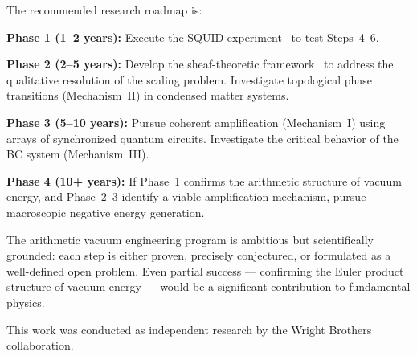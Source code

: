 \documentclass[aps,prd,twocolumn,superscriptaddress,nofootinbib]{revtex4-2}
\begin{document}
The recommended research roadmap is:

\textbf{Phase 1 (1--2 years):}
Execute the SQUID experiment~\cite{paper_A} to test Steps~4--6.

\textbf{Phase 2 (2--5 years):}
Develop the sheaf-theoretic framework~\cite{paper_B} to
address the qualitative resolution of the scaling problem.
Investigate topological phase transitions (Mechanism~II) in
condensed matter systems.

\textbf{Phase 3 (5--10 years):}
Pursue coherent amplification (Mechanism~I) using arrays of
synchronized quantum circuits. Investigate the critical behavior
of the BC system (Mechanism~III).

\textbf{Phase 4 (10+ years):}
If Phase~1 confirms the arithmetic structure of vacuum energy,
and Phase~2--3 identify a viable amplification mechanism,
pursue macroscopic negative energy generation.

The arithmetic vacuum engineering program is ambitious but
scientifically grounded: each step is either proven, precisely
conjectured, or formulated as a well-defined open problem.
Even partial success --- confirming the Euler product structure
of vacuum energy --- would be a significant contribution to
fundamental physics.

\begin{acknowledgments}
This work was conducted as independent research by the
Wright Brothers collaboration.
\end{acknowledgments}
\end{document}
